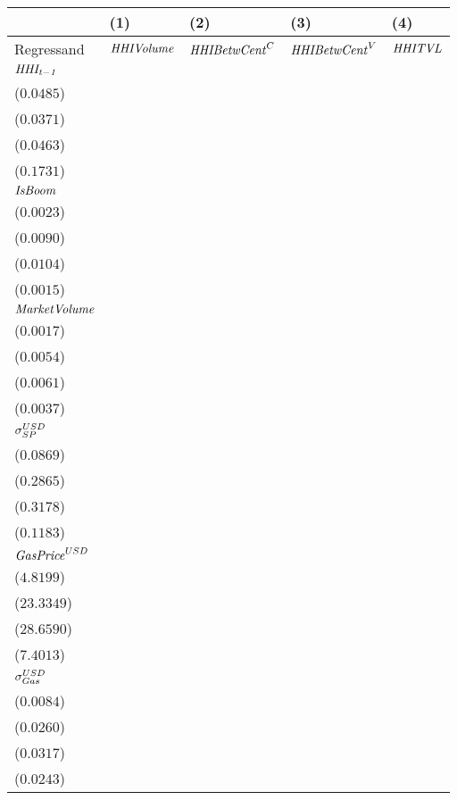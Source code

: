 \begin{tabular}{lllll}
\toprule
{} &                                       (1) &                                        (2) &                                       (3) &                                     (4) \\
\midrule
Regressand                 &                         ${\it HHIVolume}$ &                      ${\it HHIBetwCent}^C$ &                     ${\it HHIBetwCent}^V$ &                          ${\it HHITVL}$ \\
$\it HHI_{t-1}$         &   \makecell{$0.4466^{***}$ \\ ($0.0485$)} &    \makecell{$0.6562^{***}$ \\ ($0.0371$)} &   \makecell{$0.6605^{***}$ \\ ($0.0463$)} &  \makecell{$0.3992^{**}$ \\ ($0.1731$)} \\
${\it IsBoom}$             &      \makecell{$0.0034^{}$ \\ ($0.0023$)} &    \makecell{$0.0311^{***}$ \\ ($0.0090$)} &   \makecell{$0.0396^{***}$ \\ ($0.0104$)} &  \makecell{$0.0039^{**}$ \\ ($0.0015$)} \\
${\it MarketVolume}$       &      \makecell{$0.0023^{}$ \\ ($0.0017$)} &       \makecell{$0.0036^{}$ \\ ($0.0054$)} &     \makecell{$-0.0030^{}$ \\ ($0.0061$)} &   \makecell{$-0.0043^{}$ \\ ($0.0037$)} \\
${\it \sigma}^{USD}_{SP}$  &      \makecell{$0.0367^{}$ \\ ($0.0869$)} &       \makecell{$0.4625^{}$ \\ ($0.2865$)} &     \makecell{$-0.4806^{}$ \\ ($0.3178$)} &  \makecell{$-0.2154^{*}$ \\ ($0.1183$)} \\
${\it GasPrice}^{USD}$     &  \makecell{$-11.1290^{**}$ \\ ($4.8199$)} &  \makecell{$69.8927^{***}$ \\ ($23.3349$)} &  \makecell{$71.3461^{**}$ \\ ($28.6590$)} &   \makecell{$-9.1305^{}$ \\ ($7.4013$)} \\
${\it \sigma}_{Gas}^{USD}$ &    \makecell{$-0.0162^{*}$ \\ ($0.0084$)} &     \makecell{$0.0652^{**}$ \\ ($0.0260$)} &    \makecell{$0.0740^{**}$ \\ ($0.0317$)} &    \makecell{$0.0096^{}$ \\ ($0.0243$)} \\

\end{tabular}
